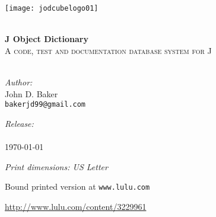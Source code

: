 \begin{titlepage}
 
\begin{center}
 
 
\texttt{[image: jodcubelogo01]}  
 
\HRule \\[1.0cm]

{ \Huge \bfseries J Object Dictionary}\\[0.4cm]

\textsc{A code, test and documentation database system for J}\\[0.5cm]
 
\HRule \\[1.0cm]
 
 
\begin{minipage}{0.4\textwidth}
\begin{flushleft}
\emph{Author:}\\
John D. Baker \\
\texttt{bakerjd99@gmail.com} \\
\end{flushleft}
\end{minipage}
\begin{minipage}{0.4\textwidth}
\begin{flushright}
\emph{Release:}\\
\jodversion \\
\today \\
\end{flushright}
\end{minipage}

\vspace{0.8cm}

\emph{Print dimensions: US Letter}

Bound printed version at \texttt{www.lulu.com}

\href{http://www.lulu.com/content/3229961}{http://www.lulu.com/content/3229961}


\end{center}
\end{titlepage}
